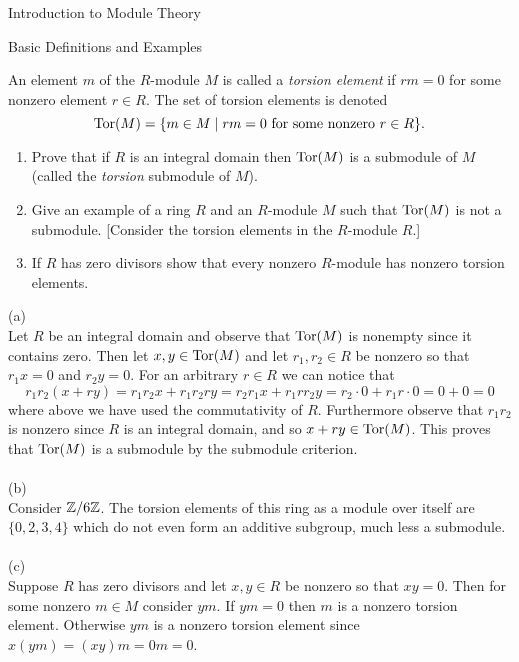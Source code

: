 \begin{chapter}{Introduction to Module Theory}
\begin{section}{Basic Definitions and Examples}
\begin{problem}\label{ex:10.1.8}
An element $m$ of the $R$-module $M$ is called a \emph{torsion element} if $rm=0$ for some nonzero element $r\in R$. The set of torsion elements is denoted \[
\operatorname{Tor}(M) = \{m\in M \mid rm=0 \text{ for some nonzero } r\in R\}.
\]
\begin{enumerate}
\item[(a)] Prove that if $R$ is an integral domain then $\operatorname{Tor}(M)$ is a submodule of $M$ (called the \emph{torsion} submodule of $M$).
\item[(b)] Give an example of a ring $R$ and an $R$-module $M$ such that $\operatorname{Tor}(M)$ is not a submodule. [Consider the torsion elements in the $R$-module $R$.]
\item[(c)] If $R$ has zero divisors show that every nonzero $R$-module has nonzero torsion elements.
\end{enumerate}
\end{problem}
\begin{solution}
(a)\\
Let $R$ be an integral domain and observe that $\operatorname{Tor}(M)$ is nonempty  since it contains zero. Then  let $x,y\in \operatorname{Tor}(M)$ and let $r_1,r_2\in R$ be nonzero so that $r_1x = 0$ and $r_2y = 0$. For an arbitrary $r\in R$ we can notice that \[
r_1r_2(x+ry) = r_1r_2x + r_1r_2ry = r_2r_1x + r_1rr_2y = r_2\cdot 0 + r_1r\cdot 0 = 0+0 = 0
\] where above we have used the commutativity of $R$. Furthermore observe that $r_1r_2$ is nonzero since $R$ is an integral domain, and so $x+ry\in \operatorname{Tor}(M)$. This proves that $\operatorname{Tor}(M)$ is a submodule by the submodule criterion.\\\\
(b)\\
Consider $\mathbb{Z}/6\mathbb{Z}$. The torsion elements of this ring as a module over itself are $\{0,2,3,4\}$ which do not even form an additive subgroup, much less a submodule.\\\\
(c)\\
Suppose $R$ has zero divisors and let $x,y\in R$ be nonzero so that $xy=0$. Then for some nonzero $m\in M$ consider $ym$. If $ym=0$ then $m$ is a nonzero torsion element. Otherwise $ym$ is a nonzero torsion element since $x(ym) = (xy)m = 0m = 0$. 

\end{solution}\oneperpage




\end{section}
\end{chapter}
